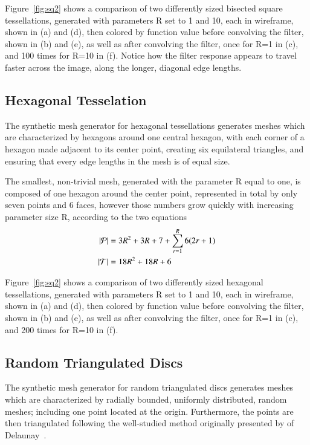 Figure~\ref{fig:sq2} shows a comparison of two differently sized bisected square tessellations, generated with parameters R set to 1 and 10, each in wireframe, shown in (a) and (d), then colored by function value before convolving the filter, shown in (b) and (e), as well as after convolving the filter, once for R=1 in (c), and 100 times for R=10 in (f). Notice how the filter response appears to travel faster across the image, along the longer, diagonal edge lengths.

%
%
%
%
\pagebreak
\subsection{Hexagonal Tesselation}
The synthetic mesh generator for hexagonal tessellations generates meshes which are characterized by hexagons around one central hexagon, with each corner of a hexagon made adjacent to its center point, creating six equilateral triangles, and ensuring that every edge lengths in the mesh is of equal size.

The smallest, non-trivial mesh, generated with the parameter R equal to one, is composed of one hexagon around the center point, represented in total by only seven points and 6 faces, however those numbers grow quickly with increasing parameter size R, according to the two equations
\begin{align}
	|\mathcal{P}| &= 3R^2 + 3R + 7 +\sum_{r=1}^R{6(2r + 1)}\\
	|\mathcal{T}| &= 18R^2 + 18R + 6
	\label{eq:hexPointAndFaceCounts}
\end{align}

Figure~\ref{fig:sq2} shows a comparison of two differently sized hexagonal tessellations, generated with parameters R set to 1 and 10, each in wireframe, shown in (a) and (d), then colored by function value before convolving the filter, shown in (b) and (e), as well as after convolving the filter, once for R=1 in (c), and 200 times for R=10 in (f).



%
%
%
%
\pagebreak
\subsection{Random Triangulated Discs}
The synthetic mesh generator for random triangulated discs generates meshes which are characterized by radially bounded, uniformly distributed, random meshes; including one point located at the origin. Furthermore, the points are then triangulated following the well-studied method originally presented by of Delaunay~\cite{Delaunay34}.

